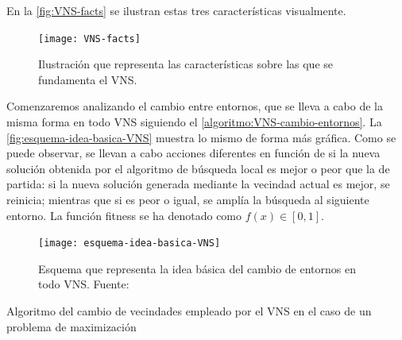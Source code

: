 En la \autoref{fig:VNS-facts} se ilustran estas tres características visualmente.

\begin{figure}
    \centering
    \texttt{[image: VNS-facts]}
    \caption[Ilustración que representa las características sobre las que se fundamenta el VNS]{Ilustración que representa las características sobre las que se fundamenta el VNS.}
    \label{fig:VNS-facts}
\end{figure}

Comenzaremos analizando el cambio entre entornos, que se lleva a cabo de la misma forma en todo VNS siguiendo el \autoref{algoritmo:VNS-cambio-entornos}. La \autoref{fig:esquema-idea-basica-VNS} muestra lo mismo de forma más gráfica.
Como se puede observar, se llevan a cabo acciones diferentes en función de si la nueva solución obtenida por el algoritmo de búsqueda local es mejor o peor que la de partida: si la nueva solución generada mediante la vecindad actual es mejor, se reinicia; mientras que si es peor o igual, se amplía la búsqueda al siguiente entorno. La función fitness se ha denotado como $f(x) \in [0,1]$.

\begin{figure}
    \centering
    \texttt{[image: esquema-idea-basica-VNS]}
    \caption[Esquema que representa la idea básica del cambio de entornos en todo VNS]{Esquema que representa la idea básica del cambio de entornos en todo VNS. Fuente:~\cite{sota:metaheuristicas-design-impl}}
    \label{fig:esquema-idea-basica-VNS}
\end{figure}

\begin{algorithm}[htbp]
    \caption{Algoritmo del cambio de vecindades empleado por el VNS en el caso de un problema de maximización}
    \label{algoritmo:VNS-cambio-entornos}

    \DontPrintSemicolon
    \medskip



\end{algorithm}

